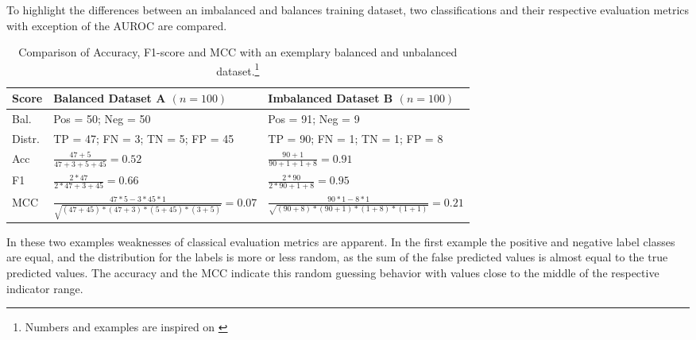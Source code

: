 

To highlight the differences between an imbalanced and balances training dataset, two classifications and their respective
evaluation metrics with exception of the \gls{AUROC} are compared.

\begin{table}[ht]
    \centering
    \begin{tabular}{@{}P{0.1\textwidth}P{0.42\textwidth}P{0.42\textwidth}@{}}
        \toprule
        Score  & Balanced Dataset A $(n = 100)$                                   & Imbalanced Dataset B  $(n = 100)$                            \\
        \midrule
        Bal.   & Pos = 50; Neg = 50                                               & Pos = 91; Neg = 9                                            \\
        \midrule
        Distr. & TP = 47; FN = 3; TN = 5; FP = 45                                 & TP = 90; FN = 1; TN = 1; FP = 8                              \\
        \midrule
        Acc    & $\frac{47 + 5}{47 + 3  + 5 + 45} = 0.52$                         & $\frac{90 + 1}{90 + 1  + 1 +8} = 0.91$                       \\
        \midrule
        F1     & $\frac{2* 47}{2*47 + 3 + 45} = 0.66$                             & $\frac{2 * 90}{2 * 90 + 1 +8} = 0.95$                        \\
        \midrule
        MCC    & $\frac{47*5 -3*45*1}{\sqrt{(47+45)*(47+3)*(5+45)*(3+5)}} = 0.07$ & $\frac{90*1 - 8*1}{\sqrt{(90+8)*(90+1)*(1+8)*(1+1)}} = 0.21$ \\
        \bottomrule
    \end{tabular}
    \caption[Comparison of Accuracy, F1-score and MCC with an exemplary balanced and unbalanced
        dataset.]{Comparison of Accuracy, F1-score and MCC with an exemplary balanced and unbalanced
        dataset.\footnote{Numbers and examples are inspired on \cite[p.9]{chicco_advantages_2020}}}
    \label{tab:indicator_comparison}
\end{table}
In these two examples weaknesses of classical evaluation metrics are apparent. In the first
example the positive and negative label classes are equal, and the distribution for the
labels is more or less random, as the sum of the false predicted values is almost equal to
the true predicted values. The accuracy and the \gls{MCC} indicate this random guessing
behavior with values close to the middle of the respective indicator range.
